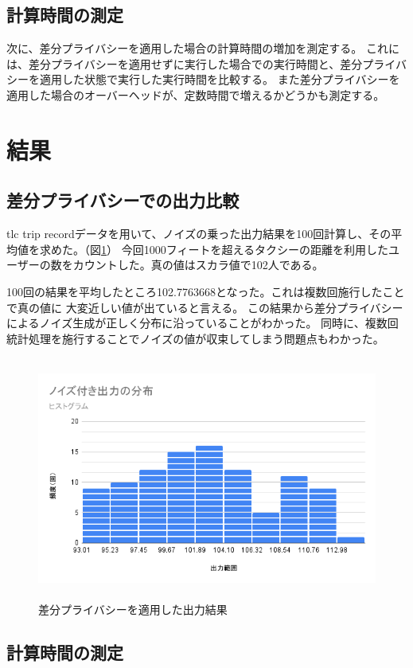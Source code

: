 \documentclass[a4paper,11pt]{jreport}
\begin{document}
\subsection{計算時間の測定}

次に、差分プライバシーを適用した場合の計算時間の増加を測定する。
これには、差分プライバシーを適用せずに実行した場合での実行時間と、差分プライバシーを適用した状態で実行した実行時間を比較する。
また差分プライバシーを適用した場合のオーバーヘッドが、定数時間で増えるかどうかも測定する。

\section{結果}
\subsection{差分プライバシーでの出力比較}

tlc trip recordデータを用いて、ノイズの乗った出力結果を100回計算し、その平均値を求めた。（図\ref{fig:noise}）
今回1000フィートを超えるタクシーの距離を利用したユーザーの数をカウントした。真の値はスカラ値で102人である。

100回の結果を平均したところ102.7763668となった。これは複数回施行したことで真の値に
大変近しい値が出ていると言える。
この結果から差分プライバシーによるノイズ生成が正しく分布に沿っていることがわかった。
同時に、複数回統計処理を施行することでノイズの値が収束してしまう問題点もわかった。

\begin{figure}[htbp]
    \centering
\includegraphics[height=80mm]{noise.png}
    \caption{差分プライバシーを適用した出力結果}
    \label{fig:noise}
\end{figure}

\subsection{計算時間の測定}
\end{document}
